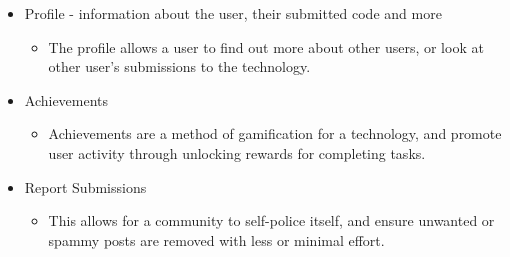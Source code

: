 \begin{itemize}
\begin{itemize}
\begin{itemize}
		\end{itemize}
		\item Profile - information about the user, their submitted code and more
		\begin{itemize}
			\item The profile allows a user to find out more about other users, or look at other user's submissions to the technology.
		\end{itemize}
		\item Achievements
		\begin{itemize}
			\item Achievements are a method of gamification \cite{Huotari2012} for a technology, and promote user activity through unlocking rewards for completing tasks.
		\end{itemize}
		\item Report Submissions
		\begin{itemize}
			\item This allows for a community to self-police itself, and ensure unwanted or spammy posts are removed with less or minimal effort.
		\end{itemize}
	\end{itemize}


\end{itemize}
